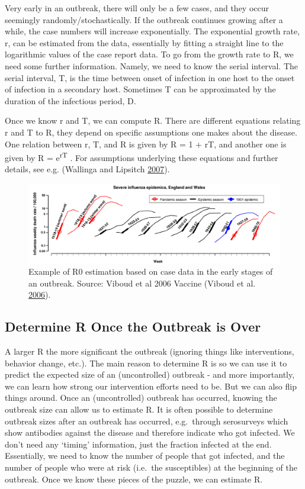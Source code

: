 \documentclass[]{article}
\theoremstyle{definition}
\theoremstyle{definition}
\theoremstyle{definition}
\theoremstyle{remark}
\begin{document}
Very early in an outbreak, there will only be a few cases, and they
occur seemingly randomly/stochastically. If the outbreak continues
growing after a while, the case numbers will increase exponentially. The
exponential growth rate, r, can be estimated from the data, essentially
by fitting a straight line to the logarithmic values of the case report
data. To go from the growth rate to R, we need some further information.
Namely, we need to know the serial interval. The serial interval, T, is
the time between onset of infection in one host to the onset of
infection in a secondary host. Sometimes T can be approximated by the
duration of the infectious period, D.

Once we know r and T, we can compute R. There are different equations
relating r and T to R, they depend on specific assumptions one makes
about the disease. One relation between r, T, and R is given by R = 1 +
rT, and another one is given by R = e\textsuperscript{rT} . For
assumptions underlying these equations and further details, see e.g.
(Wallinga and Lipsitch \protect\hyperlink{ref-wallinga07}{2007}).

\begin{figure}
\centering
\includegraphics{./images/viboud-R0.png}
\caption{Example of R0 estimation based on case data in the early stages
of an outbreak. Source: Viboud et al 2006 Vaccine (Viboud et al.
\protect\hyperlink{ref-viboud06}{2006}).}
\end{figure}

\subsection{Determine R Once the Outbreak is
Over}\label{determine-r-once-the-outbreak-is-over}

A larger R the more significant the outbreak (ignoring things like
interventions, behavior change, etc.). The main reason to determine R is
so we can use it to predict the expected size of an (uncontrolled)
outbreak - and more importantly, we can learn how strong our
intervention efforts need to be. But we can also flip things around.
Once an (uncontrolled) outbreak has occurred, knowing the outbreak size
can allow us to estimate R. It is often possible to determine outbreak
sizes after an outbreak has occurred, e.g.~through serosurveys which
show antibodies against the disease and therefore indicate who got
infected. We don't need any `timing' information, just the fraction
infected at the end. Essentially, we need to know the number of people
that got infected, and the number of people who were at risk (i.e.~the
susceptibles) at the beginning of the outbreak. Once we know these
pieces of the puzzle, we can estimate R.
\end{document}
